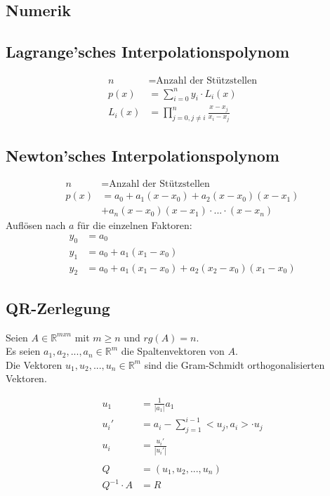 \documentclass[a4paper, landscape, 10pt]{article}
\begin{document}
\begin{multicols}{4}
\begin{small}
	\section{Numerik}
		\subsection{Lagrange'sches Interpolationspolynom}
			\begin{align*}
			n &= \text{Anzahl der Stützstellen}\\
			p(x) &= \sum_{i=0}^{n} y_i \cdot L_i(x) \\
			L_i(x) &= \prod_{j = 0, j \neq i}^{n} \frac{x - x_j}{x_i - x_j}
			\end{align*}
		\subsection{Newton'sches Interpolationspolynom}
			\begin{align*}
			n &= \text{Anzahl der Stützstellen}\\
			p(x) &= a_0 + a_1(x - x_0) + a_2(x - x_0)(x - x_1)\\
			     &+ a_n(x-x_0)(x - x_1)\cdot ... \cdot (x - x_n)
			\end{align*}
			     Auflösen nach $a$ für die einzelnen Faktoren:
			\begin{align*}
			y_0 &= a_0\\
			y_1 &= a_0 + a_1(x_1 - x_0)	\\
			y_2 &= a_0 + a_1(x_1 - x_0) + a_2(x_2 - x_0)(x_1 - x_0)
			\end{align*}
		\subsection{QR-Zerlegung}
			Seien $A \in \mathbb{R}^{mxn}$ mit $m \ge n$ und $rg(A) = n$.\\
			 Es seien $a_1, a_2, ..., a_n \in \mathbb{R}^m$ die Spaltenvektoren von $A$. \\
			 Die Vektoren $u_1, u_2, ..., u_n \in \mathbb{R}^m$ sind die Gram-Schmidt orthogonalisierten Vektoren.
			 
			 \begin{align*}
			 	u_1 &= \frac{1}{|a_1|} a_1\\
			 	u_i' &= a_i - \sum_{j = 1}^{i-1} <u_j, a_i> \cdot u_j\\
			 	u_i &= \frac{u_i'}{|u_i'|}
			 	\\\\
			 	Q &= (u_1, u_2, ..., u_n)\\
			 	Q^{-1}\cdot A &= R 
			 	\end{align*}

\end{small}
\end{multicols}
\end{document}
